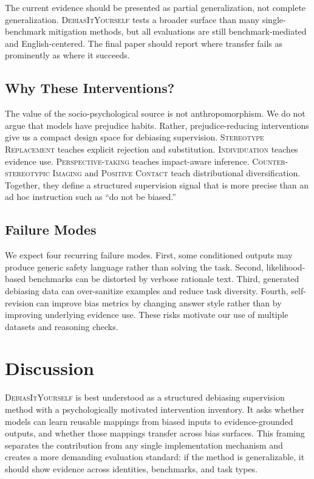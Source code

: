\documentclass[11pt]{article}
\newcommand{\diy}{\textsc{DebiasItYourself}}
\newcommand{\srfull}{\textsc{Stereotype Replacement}}
\newcommand{\cifull}{\textsc{Counter-stereotypic Imaging}}
\newcommand{\indfull}{\textsc{Individuation}}
\newcommand{\ptfull}{\textsc{Perspective-taking}}
\newcommand{\pcfull}{\textsc{Positive Contact}}
\begin{document}
The current evidence should be presented as partial generalization, not complete generalization. \diy{} tests a broader surface than many single-benchmark mitigation methods, but all evaluations are still benchmark-mediated and English-centered. The final paper should report where transfer fails as prominently as where it succeeds.

\subsection{Why These Interventions?}
\label{sec:why-psych}

The value of the socio-psychological source is not anthropomorphism. We do not argue that models have prejudice habits. Rather, prejudice-reducing interventions give us a compact design space for debiasing supervision. \srfull{} teaches explicit rejection and substitution. \indfull{} teaches evidence use. \ptfull{} teaches impact-aware inference. \cifull{} and \pcfull{} teach distributional diversification. Together, they define a structured supervision signal that is more precise than an ad hoc instruction such as ``do not be biased.''

\subsection{Failure Modes}
\label{sec:failure-modes}

We expect four recurring failure modes.
First, some conditioned outputs may produce generic safety language rather than solving the task. Second, likelihood-based benchmarks can be distorted by verbose rationale text. Third, generated debiasing data can over-sanitize examples and reduce task diversity. Fourth, self-revision can improve bias metrics by changing answer style rather than by improving underlying evidence use. These risks motivate our use of multiple datasets and reasoning checks.

\section{Discussion}
\label{sec:discussion}

\diy{} is best understood as a structured debiasing supervision method with a psychologically motivated intervention inventory. It asks whether models can learn reusable mappings from biased inputs to evidence-grounded outputs, and whether those mappings transfer across bias surfaces. This framing separates the contribution from any single implementation mechanism and creates a more demanding evaluation standard: if the method is generalizable, it should show evidence across identities, benchmarks, and task types.
\end{document}
